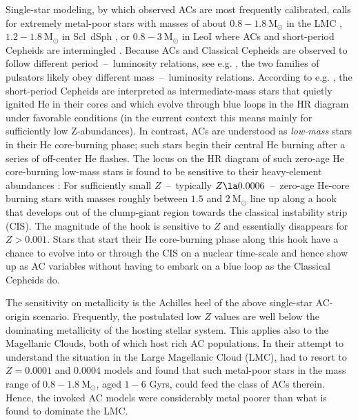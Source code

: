 \documentclass[a4paper,fleqn,usenatbib]{mnras}
\newcommand{\msol}{~\mathrm{M}_\odot}
\begin{document}
Single-star modeling, by which observed ACs are most frequently
calibrated, calls for extremely metal-poor stars with masses of about
$0.8 - 1.8 \msol$ in the LMC \citep{Fiorentino2012}, $1.2 - 1.8 \msol$
in Scl~dSph \citep{Martinez2016}, or $0.8 - 3 \msol$ in LeoI where ACs
and short-period Cepheids are intermingled \citep{Stetson2014}.
Because ACs and Classical Cepheids are observed to follow different
period~--~luminosity relations, see e.g. \citet{Soszynski2015}, the
two families of pulsators likely obey different mass~--~luminosity
relations.  According to e.g. \citet{Fiorentino2012}, the short-period
Cepheids are interpreted as intermediate-mass stars that quietly
ignited He in their cores and which evolve through blue loops in the
HR diagram under favorable conditions (in the current context this
means mainly for sufficiently low Z-abundances). In contrast, ACs are
understood as \emph{low-mass} stars in their He core-burning phase;
such stars begin their central He burning after a series of off-center
He flashes. The locus on the HR diagram of such zero-age He
core-burning low-mass stars is found to be sensitive to their
heavy-element abundances \citep[see e.g. Fig.~3
in][]{Fiorentino2012a}: For sufficiently small $Z$~--~typically
$Z\la 0.0006$~--~zero-age He-core burning stars with masses roughly
between $1.5$ and $2 \msol$ line up along a hook that develops out of
the clump-giant region towards the classical instability strip
(CIS). The magnitude of the hook is sensitive to $Z$ and essentially
disappears for $Z > 0.001$. Stars that start their He core-burning
phase along this hook have a chance to evolve into or through the CIS
on a nuclear time-scale and hence show up as AC variables without
having to embark on a blue loop as the Classical Cepheids do.

The sensitivity on metallicity is the Achilles heel of the above
single-star AC-origin scenario.  Frequently, the postulated low $Z$
values are well below the dominating metalli\-ci\-ty of the hosting
stellar system.  This applies also to the Magellanic Clouds, both of
which host rich AC populations.  In their attempt to understand the
situation in the Large Magellanic Cloud (LMC), \citet{Fiorentino2012}
had to resort to $Z=0.0001$ and $0.0004$ models and found that such
metal-poor stars in the mass range of $0.8 - 1.8 \msol$, aged $1 - 6$
Gyrs, could feed the class of ACs therein. Hence, the invoked AC
models were considerably metal poorer than what is found to dominate
the LMC.
\end{document}
